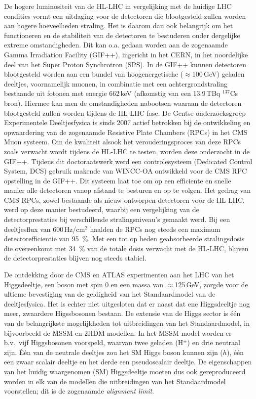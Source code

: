 De hogere luminositeit van de HL-LHC in vergelijking met de huidige LHC condities
vormt een uitdaging voor de detectoren die blootgesteld zullen worden aan hogere
hoeveelheden straling. Het is daarom dan ook belangrijk om het functioneren en de
stabiliteit van de detectoren te bestuderen onder dergelijke extreme
omstandigheden. Dit kan o.a. gedaan worden aan de zogenaamde Gamma Irradiation Facility (GIF++),
ingericht in het CERN, in het noordelijke deel van het Super Proton
Synchrotron (SPS). In de GIF++ kunnen detectoren blootgesteld worden aan een
bundel van hoogenergetische ($\approx$100\,GeV) geladen deeltjes,
voornamelijk muonen, in combinatie met een achtergrondstraling bestaande uit 
fotonen met energie 662\,keV (afkomstig
van een 13.9\,TBq $^{137}$Cs bron). Hiermee kan men de omstandigheden nabootsen
waaraan de detectoren blootgesteld zullen worden tijdens de HL-LHC fase. 
De Gentse onderzoeksgroep Experimentele Deeltjesfysica is sinds 2007 actief
betrokken bij de ontwikkeling en opwaardering van de zogenaamde Resistive
Plate Chambers (RPCs) in het CMS Muon systeem. Om de kwaliteit alsook het
verouderingsproces van deze RPCs zoals verwacht wordt tijdens de HL-LHC te
testen, worden deze onderzocht in de 
GIF++. Tijdens dit doctoraatswerk werd een controlesysteem (Dedicated Control
System, DCS)
gebruik makende van WINCC-OA ontwikkeld voor de CMS RPC opstelling in de GIF++.
Dit systeem laat toe om op een efficiente en snelle manier alle
detectoren vanop afstand te besturen en op te volgen. Het
gedrag van CMS RPCs, zowel bestaande als nieuw ontworpen detectoren voor de HL-LHC, werd op
deze manier bestudeerd, waarbij een vergelijking van de detectorprestaties bij
verschillende stralingsniveau's gemaakt werd. Bij een deeltjesflux van
600\,Hz/cm$^{2}$ haalden de RPCs nog steeds een
maximum detectorefficientie van 95~\%. Met een tot op heden
geabsorbeerde stralingsdosis
die overeenkomt met 34~\% van de totale dosis verwacht met de HL-LHC, blijven
de detectorprestaties blijven nog steeds stabiel. 
 	
De ontdekking door de CMS en ATLAS experimenten aan het LHC van het
Higgsdeeltje, een boson met spin 0 en een massa van 
$\approx$125\,GeV, zorgde voor de
ultieme bevestiging van de geldigheid van het 
Standaardmodel van de deeltjesfysica. Het is echter niet uitgesloten dat er
naast dat ene Higgsdeeltje
nog meer, zwaardere Higssbosonen bestaan. De extensie van de Higgs sector is
\'e\'en van de belangrijkste mogelijkheden tot uitbreidingen van het
Standaardmodel, in bijvoorbeeld de MSSM en 2HDM modellen. In het MSSM model
worden er b.v.~vijf Higgsbosonen voorspeld, waarvan twee geladen
(H$^{\pm}$) en drie neutraal zijn. \'E\'en van de neutrale deeltjes zou het SM
Higgs boson kunnen zijn 
($h$), \'e\'en een zwaar scalair deeltje en het derde een pseudoscalair
deeltje. De eigenschappen van het huidig waargenomen (SM) Higgsdeeltje moeten dus ook
gereproduceerd worden in elk van de modellen die uitbreidingen van het
Standaardmodel voorstellen; dit is de zogenaamde {\it alignment limit}.  

